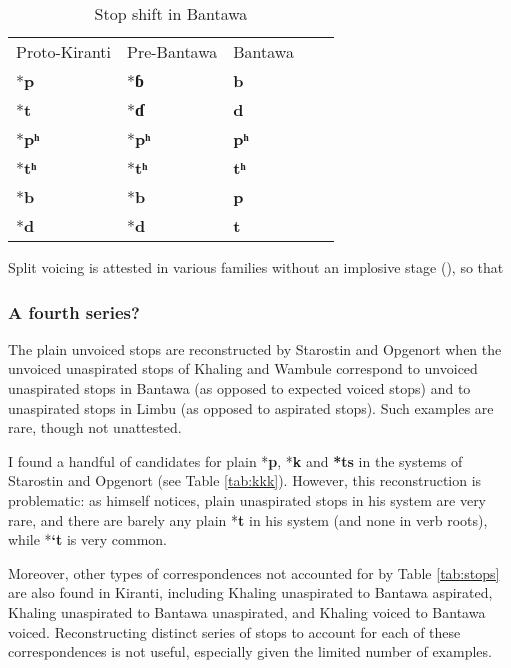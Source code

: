\documentclass[oneside,a4paper,11pt]{article}
\newcommand{\ipa}[1]{\textbf{{\phon\mbox{#1}}}} %
\begin{document}
 

\begin{table}[H]
\caption{Stop shift in Bantawa} \centering \label{tab:bantawa}
\begin{tabular}{lllll}
Proto-Kiranti &  Pre-Bantawa &   Bantawa \\
*\ipa{p} & *\ipa{ɓ} & \ipa{b} \\
*\ipa{t} & *\ipa{ɗ} & \ipa{d} \\
*\ipa{pʰ} & *\ipa{pʰ} &  \ipa{pʰ} \\
*\ipa{tʰ} & *\ipa{tʰ} & \ipa{tʰ} \\
*\ipa{b} & *\ipa{b} &  \ipa{p} \\
*\ipa{d} & *\ipa{d} & \ipa{t} \\
\end{tabular}
\end{table}
 
 Split voicing is attested in various families without an implosive stage (\citealt[49-51]{kuemmel07wandel}), so that 

 
 

\subsubsection{A fourth series?} \label{sec:fourth}
The plain unvoiced stops are reconstructed by Starostin and Opgenort  when the unvoiced unaspirated stops of Khaling and Wambule correspond to unvoiced unaspirated stops in Bantawa (as opposed to expected voiced stops) and to unaspirated stops in Limbu (as opposed to aspirated stops). Such examples are rare, though not unattested. 

I found a handful of candidates for plain *\ipa{p}, *\ipa{k} and \ipa{*ts} in the systems of Starostin and Opgenort (see Table \ref{tab:kkk}). However, this reconstruction is problematic: as \citet[17]{opgenort05jero} himself notices, plain unaspirated stops in his system are very rare, and there are barely any plain *\ipa{t} in his system (and none in verb roots), while *\ipa{`t} is very common.  

Moreover, other types of correspondences not accounted for by Table \ref{tab:stops} are also found in Kiranti, including Khaling  unaspirated to Bantawa aspirated, Khaling unaspirated to Bantawa unaspirated, and Khaling voiced to Bantawa voiced. Reconstructing distinct series of stops to account for each of these correspondences is not useful, especially given the limited number of examples. 
\end{document}

